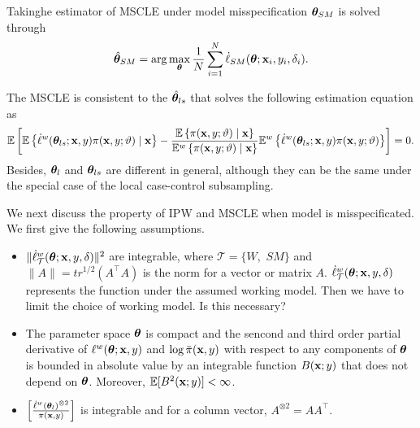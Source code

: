 \documentclass[12pt,hidelinks]{article}
\begin{document}
Takinghe estimator of MSCLE under model misspecification $\bm{\theta}_{SM}$ is solved through
\begin{equation*}
    {\hat{\bm{\theta}}}_{SM} = \arg\max_{\bm{\theta}} \frac{1}{N} \sum_{i=1}^{N} \dot \ell_{SM}(\bm{\theta}; \mathbf{x}_i, y_i, \delta_i).
\end{equation*}

The MSCLE is consistent to the ${\hat{\bm{\theta}}}_{ls}$ that solves the following estimation equation \citet{wang2022maximum} as
\begin{align}\label{eq:theta_ls}
        \mathbb{E} \left[ \mathbb{E} \left\{ \dot \ell^w(\bm{\theta}_{ls}; \mathbf{x}, y) \pi(\mathbf{x},y;\vartheta) \mid \mathbf{x} \right\}  -\frac{\mathbb{E} \left\{ \pi(\mathbf{x},y;\vartheta) \mid \mathbf{x} \right\}}{\mathbb{E}^w \left\{ \pi(\mathbf{x},y;\vartheta) \mid \mathbf{x} \right\} } \mathbb{E}^w \left\{ \dot \ell^w(\bm{\theta}_{ls}; \mathbf{x}, y) \pi(\mathbf{x},y;\vartheta) \right\} \right] = 0.
    \end{align}
Besides, $\bm{\theta}_l$ and $\bm{\theta}_{ls}$ are different in general, although they can be the same under the special case of the local case-control subsampling.


We next discuss the property of IPW and MSCLE when model is misspecificated.
We first give the following assumptions. 
\begin{assumption}
    \begin{itemize}
        \item[(1)] $\| \dot \ell_{\mathcal{T}}^w (\bm{\theta}; \mathbf{x}, y, \delta)\|^2$ are integrable, where $\mathcal{T} = \{W,$ $SM\}$ and $\|A\| = tr^{1/2} (A^\top A)$ is the norm for a vector or matrix $A$.
        {\color{red} $\dot \ell_{\mathcal{T}}^w (\bm{\theta}; \mathbf{x}, y, \delta)$ represents the function under the assumed working model. Then we have to limit the choice of working model. Is this necessary?}
        \item[(2)] The parameter space $\bm{\theta}$ is compact and the sencond and third order partial derivative of $\ell^w (\bm{\theta}; \mathbf{x}, y)$ and $\log \bar{\pi}(\mathbf{x}, y)$ with respect to any components of $\bm{\theta}$ is bounded in absolute value by an integrable function $B(\mathbf{x}; y)$ that does not depend on $\bm{\theta}$. Moreover, $\mathbb{E}[B^2(\mathbf{x}; y)] < \infty$.
        \item[(3)] $\left[\frac{\dot \ell^w( \bm{\theta}_l)^{\otimes 2}}{\pi(\mathbf{x}, y)}\right]$ is integrable and for a column vector, $A^{\otimes 2} = A A^\top$.
    \end{itemize}
\end{assumption}
\end{document}
